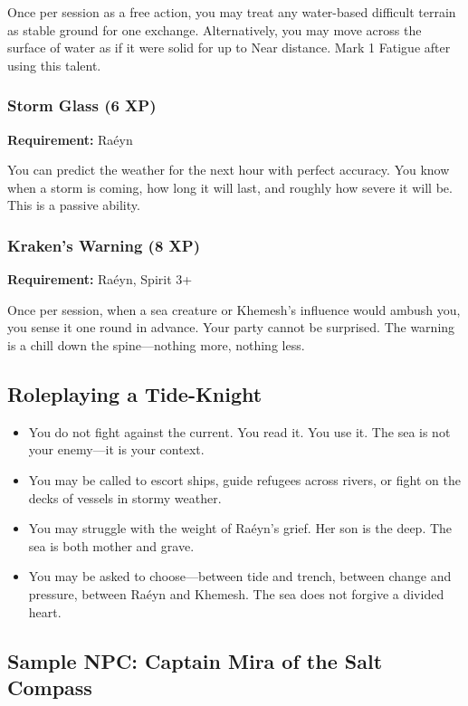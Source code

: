 Once per session as a free action, you may treat any water-based difficult terrain as stable ground for one exchange. Alternatively, you may move across the surface of water as if it were solid for up to Near distance. Mark 1 Fatigue after using this talent.

\subsubsection{Storm Glass (6 XP)}

\textbf{Requirement:} Raéyn

You can predict the weather for the next hour with perfect accuracy. You know when a storm is coming, how long it will last, and roughly how severe it will be. This is a passive ability.

\subsubsection{Kraken's Warning (8 XP)}

\textbf{Requirement:} Raéyn, Spirit 3+

Once per session, when a sea creature or Khemesh's influence would ambush you, you sense it one round in advance. Your party cannot be surprised. The warning is a chill down the spine—nothing more, nothing less.

\subsection{Roleplaying a Tide-Knight}

\begin{itemize}
\item You do not fight against the current. You read it. You use it. The sea is not your enemy—it is your context.
\item You may be called to escort ships, guide refugees across rivers, or fight on the decks of vessels in stormy weather.
\item You may struggle with the weight of Raéyn's grief. Her son is the deep. The sea is both mother and grave.
\item You may be asked to choose—between tide and trench, between change and pressure, between Raéyn and Khemesh. The sea does not forgive a divided heart.
\end{itemize}

\subsection{Sample NPC: Captain Mira of the Salt Compass}

